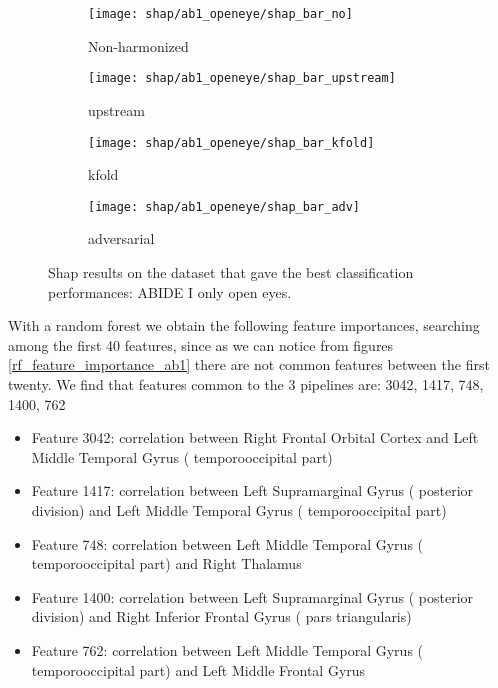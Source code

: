 \documentclass[10pt]{report}
\begin{document}
\begin{figure}
\centering
\begin{subfigure}[b]{.45\textwidth}
   \texttt{[image: shap/ab1\_openeye/shap\_bar\_no]}
   \caption{Non-harmonized}
   \label{}
\end{subfigure}
\begin{subfigure}[b]{.45\textwidth}
   \texttt{[image: shap/ab1\_openeye/shap\_bar\_upstream]}
   \caption{upstream}
   \label{}
\end{subfigure}
\begin{subfigure}[b]{.45\textwidth}
   \texttt{[image: shap/ab1\_openeye/shap\_bar\_kfold]}
   \caption{kfold}
   \label{}
\end{subfigure}
\begin{subfigure}[b]{.45\textwidth}
   \texttt{[image: shap/ab1\_openeye/shap\_bar\_adv]}
   \caption{adversarial}
   \label{}
\end{subfigure}
\caption{Shap results on the dataset that gave the best classification performances: ABIDE I only open eyes.}
\label{fig:shap_ab1}
\end{figure}




With a random forest we obtain the following feature importances, searching among the first 40 features, since as we can notice from figures \ref{rf_feature_importance_ab1} there are not common features between the first twenty.
We find that features common to the 3 pipelines are: 3042, 1417, 748, 1400, 762


\begin{itemize}
\item Feature 3042: correlation between Right Frontal Orbital Cortex  and Left Middle Temporal Gyrus ( temporooccipital part)
\item Feature 1417: correlation between Left Supramarginal Gyrus ( posterior division) and Left Middle Temporal Gyrus ( temporooccipital part)
\item Feature 748: correlation between Left Middle Temporal Gyrus ( temporooccipital part) and Right Thalamus
\item Feature 1400: correlation between Left Supramarginal Gyrus ( posterior division) and Right Inferior Frontal Gyrus ( pars triangularis)
\item Feature 762: correlation between Left Middle Temporal Gyrus ( temporooccipital part) and Left Middle Frontal Gyrus
\end{itemize}
\end{document}
